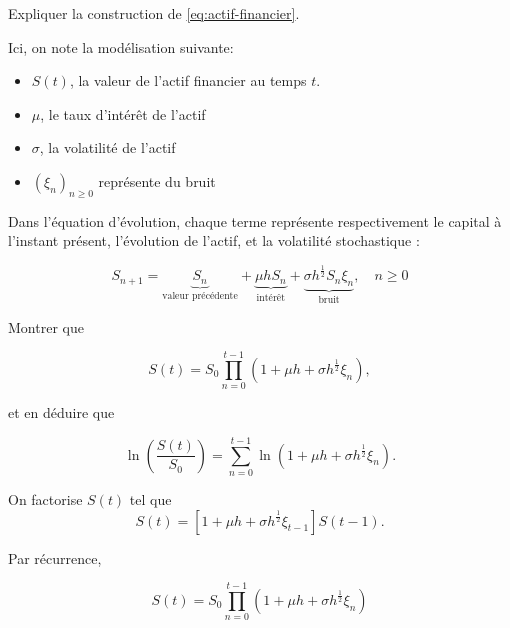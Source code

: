 \documentclass[answers, 10pt]{exam}
\begin{document}
\begin{questions}
	\question 
	Expliquer la construction de \cref{eq:actif-financier}.

	\begin{solutionorbox}
		Ici, on note la modélisation suivante:
		
		\begin{itemize}
			\item $S(t)$, la valeur de l'actif financier au temps $t$.
			\item $\mu$, le taux d'intérêt de l'actif
			\item $\sigma$, la volatilité de l'actif
			\item $(\xi_n)_{n\geq 0}$ représente du bruit
		\end{itemize}

		Dans l'équation d'évolution, chaque terme représente
		respectivement le capital à l'instant présent, l'évolution de
		l'actif, et la volatilité stochastique :

		\begin{equation*}
			S_{n+1} = \underbrace{S_n}_{\text{valeur précédente}} 
			+ \underbrace{\mu h S_n}_{\text{intérêt}} 
			+ \underbrace{\sigma h^{ \frac{1}{2} } S_n \xi_n}_{\text{bruit}}
			,\quad n \geq 0 
		\end{equation*}

	\end{solutionorbox}

	\question
	Montrer que

	\begin{equation*}
		S(t) = S_0 \prod_{n=0}^{t-1} (1 + \mu h + \sigma h^{\frac{1}{2}} \xi_n
)		,
	\end{equation*}

	et en déduire que 

	\begin{equation*}
		\ln \left( \frac{S(t)}{S_0} \right) = \sum_{n=0}^{t-1} \ln(1 + \mu h + \sigma h^{\frac{1}{2}} \xi_n).
	\end{equation*}

	\begin{solutionorbox}
		On factorise $S(t)$ tel que 
		\begin{equation*}
		S(t) = \left[ 1 + \mu h + \sigma h^{\frac{1}{2}} \xi_{t-1}\right] S(t-1).
		\end{equation*}	

		Par récurrence,

		\begin{equation*}
			S(t) = S_0 \prod_{n=0}^{t-1}  (1 + \mu h + \sigma h^{\frac{1}{2}}\xi_n
) 		\end{equation*}
		

\end{solutionorbox}
\end{questions}
\end{document}
